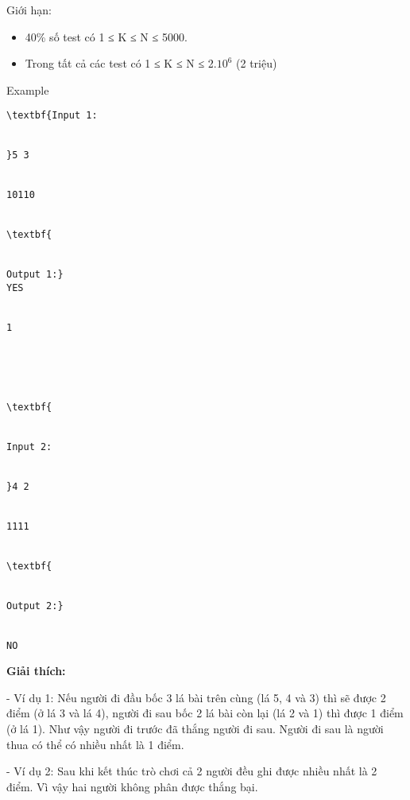 Giới hạn:
\begin{itemize}
	\item     40\% số test có 1 ≤ K ≤ N ≤ 5000.   
	\item     Trong tất cả các test có 1 ≤ K ≤ N ≤ 2.$10^{6}$    (2 triệu)   
\end{itemize}
\begin{itemize}
\end{itemize}
Example
\begin{verbatim}
\textbf{Input 1:


}5 3


10110


\textbf{


Output 1:}
YES


1





\textbf{


Input 2:


}4 2


1111


\textbf{


Output 2:}


NO\end{verbatim}

\textbf{    Giải thích:   }

   - Ví dụ 1: Nếu người đi đầu bốc 3 lá bài trên cùng (lá 5, 4 và 3) thì sẽ được 2 điểm (ở lá 3 và lá 4), người đi sau bốc 2 lá bài còn lại (lá 2 và 1) thì được 1 điểm (ở lá 1). Như vậy người đi trước đã thắng người đi sau. Người đi sau là người thua có thể có nhiều nhất là 1 điểm.  

   - Ví dụ 2: Sau khi kết thúc trò chơi cả 2 người đều ghi được nhiều nhất là 2 điểm. Vì vậy hai người không phân được thắng bại.
